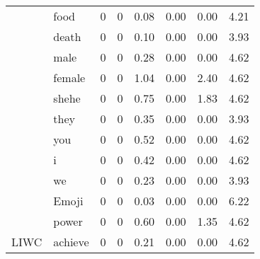 \begin{table}[!h]
\begin{tabular}[t]{llrrrrrr}
 & food & 0 & 0 & 0.08 & 0.00 & 0.00 & 4.21\\
\cmidrule{2-8}
 & death & 0 & 0 & 0.10 & 0.00 & 0.00 & 3.93\\
\cmidrule{2-8}
 & male & 0 & 0 & 0.28 & 0.00 & 0.00 & 4.62\\
\cmidrule{2-8}
 & female & 0 & 0 & 1.04 & 0.00 & 2.40 & 4.62\\
\cmidrule{2-8}
 & shehe & 0 & 0 & 0.75 & 0.00 & 1.83 & 4.62\\
\cmidrule{2-8}
 & they & 0 & 0 & 0.35 & 0.00 & 0.00 & 3.93\\
\cmidrule{2-8}
 & you & 0 & 0 & 0.52 & 0.00 & 0.00 & 4.62\\
\cmidrule{2-8}
 & i & 0 & 0 & 0.42 & 0.00 & 0.00 & 4.62\\
\cmidrule{2-8}
 & we & 0 & 0 & 0.23 & 0.00 & 0.00 & 3.93\\
\cmidrule{2-8}
 & Emoji & 0 & 0 & 0.03 & 0.00 & 0.00 & 6.22\\
\cmidrule{2-8}
 & power & 0 & 0 & 0.60 & 0.00 & 1.35 & 4.62\\
\cmidrule{2-8}
\multirow{-33}{*}{\raggedright\arraybackslash LIWC} & achieve & 0 & 0 & 0.21 & 0.00 & 0.00 & 4.62\\
\bottomrule
\end{tabular}
\end{table}
